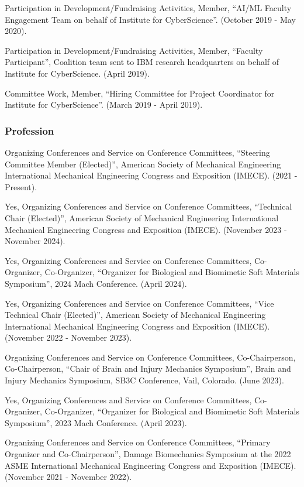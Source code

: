 \documentclass[11pt]{article}
\begin{document}
Participation in Development/Fundraising Activities, Member,
``AI/ML Faculty Engagement Team on behalf of Institute for CyberScience''.
(October 2019 - May 2020).

Participation in Development/Fundraising Activities, Member,
``Faculty Participant'', Coalition team sent to IBM research headquarters
on behalf of Institute for CyberScience. 
(April 2019).

Committee Work, Member, ``Hiring Committee for Project
Coordinator for Institute for CyberScience''. 
(March 2019 - April 2019).

\subsubsection{Profession}\label{profession}

Organizing Conferences and Service on Conference Committees,
``Steering Committee Member (Elected)'', American Society of Mechanical
Engineering International Mechanical Engineering Congress and Exposition
(IMECE). 
(2021 - Present).

Yes, Organizing Conferences and Service on Conference
Committees, ``Technical Chair (Elected)'', American Society of Mechanical
Engineering International Mechanical Engineering Congress and Exposition
(IMECE). 
(November 2023 - November 2024).

Yes, Organizing Conferences and Service on Conference
Committees, Co-Organizer, Co-Organizer, ``Organizer for Biological and
Biomimetic Soft Materials Symposium'', 2024 Mach Conference. 
(April
2024).

Yes, Organizing Conferences and Service on Conference
Committees, ``Vice Technical Chair (Elected)'', American Society of
Mechanical Engineering International Mechanical Engineering Congress and
Exposition (IMECE). 
(November 2022 - November 2023).

Organizing Conferences and Service on Conference Committees,
Co-Chairperson, Co-Chairperson, ``Chair of Brain and Injury Mechanics
Symposium'', Brain and Injury Mechanics Symposium, SB3C Conference, Vail,
Colorado. 
(June 2023).

Yes, Organizing Conferences and Service on Conference
Committees, Co-Organizer, Co-Organizer, ``Organizer for Biological and
Biomimetic Soft Materials Symposium'', 2023 Mach Conference. 
(April
2023).

Organizing Conferences and Service on Conference Committees,
``Primary Organizer and Co-Chairperson'', Damage Biomechanics Symposium at
the 2022 ASME International Mechanical Engineering Congress and
Exposition (IMECE). 
(November 2021 - November 2022).
\end{document}
